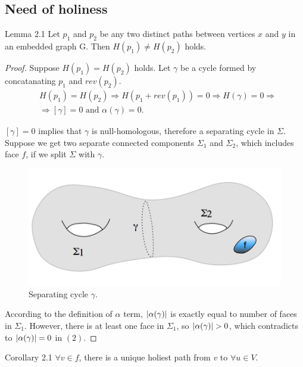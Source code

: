 \documentclass{article}
\begin{document}
\subsection{Need of holiness}

\begin{oneshot}{Lemma 2.1}
Let $p_1$ and $p_2$ be any two distinct paths between vertices $x$ and $y$ in an embedded graph G. Then $H(p_1) \neq H(p_2)$ holds. 
\end{oneshot}
\begin{proof}
Suppose $H(p_1) = H(p_2)$ holds. Let $\gamma$ be a cycle formed by concatanating $p_1$ and $rev(p_2)$.
\begin{align}
& H(p_1) = H(p_2) \Rightarrow H(p_1 + rev(p_1)) = 0 \Rightarrow  H(\gamma) = 0 \Rightarrow \\
&  \Rightarrow [\gamma] = 0 \text{ and } \alpha(\gamma) = 0.
\end{align}

$[\gamma] = 0$ implies that $\gamma$ is null-homologous, therefore a separating cycle in $\Sigma$. Suppose we get two separate connected components $\Sigma_1$ and $\Sigma_2$, which includes face $f$, if we split $\Sigma$ with $\gamma$. \\

\begin{figure}[H]
  \label{fig: g2_separating_cycle}
  \centering
  \includegraphics[scale = 0.55]{figures/g2_separating_cycle.png}
  \caption{Separating cycle $\gamma$.}
\end{figure}

According to the definition of $\alpha$ term, $\mathopen| \alpha(\gamma) \mathclose|$ is exactly equal to number of faces in $\Sigma_1$. However, there is at least one face in $\Sigma_1$, so $\mathopen| \alpha(\gamma) \mathclose| > 0$, which contradicts to $\mathopen| \alpha(\gamma) \mathclose| = 0$ in $(2)$.
\end{proof}

\begin{oneshot}{Corollary 2.1}
$\forall v \in f$, there is a unique holiest path from $v$ to $\forall u \in V$.
\end{oneshot}
\end{document}
